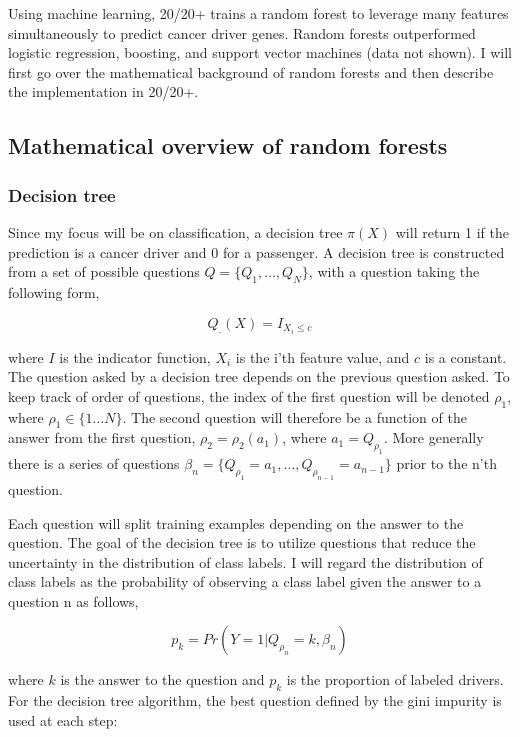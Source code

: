 Using machine learning, 20/20+ trains a random forest to leverage many features simultaneously to predict cancer driver genes. Random forests outperformed logistic regression, boosting, and support vector machines (data not shown). I will first go over the mathematical background of random forests and then describe the implementation in 20/20+.

\subsection{Mathematical overview of random forests}

\subsubsection{Decision tree}

Since my focus will be on classification, a decision tree $\pi(X)$ will return 1 if the prediction is a cancer driver and 0 for a passenger. A decision tree is constructed from a set of possible questions $Q=\{Q_1,\ldots,Q_N\}$, with a question taking the following form,

\begin{equation}
Q_.(X)=I_{X_i \leq c}
\end{equation}

where $I$ is the indicator function, $X_i$ is the i'th feature value, and $c$ is a constant. The question asked by a decision tree depends on the previous question asked. To keep track of order of questions, the index of the first question will be denoted $\rho_1$, where $\rho_1\in\{1\ldots N\}$. The second question will therefore be a function of the answer from the first question, $\rho_2=\rho_2(a_1)$, where $a_1=Q_{\rho_1}$. More generally there is a series of questions $\beta_n=\{Q_{\rho_1}=a_1,\ldots,Q_{\rho_{n-1}}=a_{n-1}\}$ prior to the n'th question.

Each question will split training examples depending on the answer to the question. The goal of the decision tree is to utilize questions that reduce the uncertainty in the distribution of class labels. I will regard the distribution of class labels as the probability of observing a class label given the answer to a question n as follows,

\begin{equation}
p_k=Pr⁡(Y=1|Q_{ρ_n}=k,\beta_n)
\end{equation}

where $k$ is the answer to the question and $p_k$ is the proportion of labeled drivers. For the decision tree algorithm, the best question defined by the gini impurity is used at each step:

